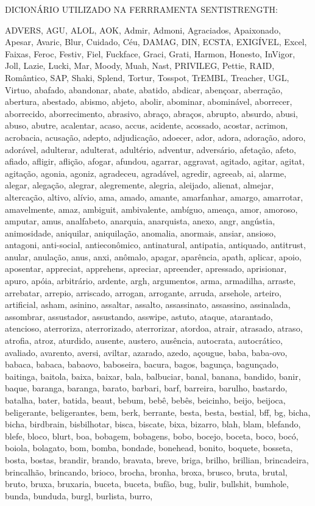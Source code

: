 \newpage
{}

DICIONÁRIO UTILIZADO NA FERRRAMENTA SENTISTRENGTH:



ADVERS, AGU, ALOL, AOK, Admir, Admoni, Agraciados, Apaixonado, Apesar, Avaric, Blur, Cuidado, Céu, DAMAG, DIN, ECSTA, EXIGÍVEL, Excel, Faixas, Feroc, Festiv, Fiel, Fuckface, Graci, Grati, Harmon, Honesto, InVigor, Joll, Lazie, Lucki, Mar, Moody, Muah, Nast, PRIVILEG, Pettie, RAID, Romântico, SAP, Shaki, Splend, Tortur, Tosspot, TrEMBL, Treacher, UGL, Virtuo, abafado, abandonar, abate, abatido, abdicar, abençoar, aberração, abertura, abestado, abismo, abjeto, abolir, abominar, abominável, aborrecer, aborrecido, aborrecimento, abrasivo, abraço, abraços, abrupto, absurdo, abusi, abuso, abutre, acalentar, acaso, accus, acidente, acossado, acostar, acrimon, acrobacia, acusação, adepto, adjudicação, adoecer, ador, adora, adoração, adoro, adorável, adulterar, adulterat, adultério, adventur, adversário, afetação, afeto, afiado, afligir, aflição, afogar, afundou, agarrar, aggravat, agitado, agitar, agitat, agitação, agonia, agoniz, agradeceu, agradável, agredir, agreeab, ai, alarme, alegar, alegação, alegrar, alegremente, alegria, aleijado, alienat, almejar, altercação, altivo, alívio, ama, amado, amante, amarfanhar, amargo, amarrotar, amavelmente, amaz, ambiguit, ambivalente, ambíguo, ameaça, amor, amoroso, amputar, amus, analfabeto, anarquia, anarquista, anexo, angr, angústia, animosidade, aniquilar, aniquilação, anomalia, anormais, ansiar, ansioso, antagoni, anti-social, antieconômico, antinatural, antipatia, antiquado, antitrust, anular, anulação, anus, anxi, anômalo, apagar, aparência, apath, aplicar, apoio, aposentar, appreciat, apprehens, apreciar, apreender, apressado, aprisionar, apuro, apóia, arbitrário, ardente, argh, argumentos, arma, armadilha, arraste, arrebatar, arrepio, arriscado, arrogan, arrogante, arruda, arsehole, arteiro, artificial, asham, asinino, assaltar, assalto, assassinato, assassino, assinalada, assombrar, assustador, assustando, asswipe, astuto, ataque, atarantado, atencioso, aterroriza, aterrorizado, aterrorizar, atordoa, atrair, atrasado, atraso, atrofia, atroz, aturdido, ausente, austero, ausência, autocrata, autocrático, avaliado, avarento, aversi, aviltar, azarado, azedo, açougue, baba, baba-ovo, babaca, babaca, babaovo, baboseira, bacura, bagos, bagunça, bagunçado, baitinga, baitola, baixa, baixar, bala, balbuciar, banal, banana, bandido, banir, baque, baranga, baranga, barato, barbari, barf, barreira, barulho, bastardo, batalha, bater, batida, beaut, bebum, bebê, bebês, beicinho, beijo, beijoca, beligerante, beligerantes, bem, berk, berrante, besta, besta, bestial, bff, bg, bicha, bicha, birdbrain, bisbilhotar, bisca, biscate, bixa, bizarro, blah, blam, blefando, blefe, bloco, blurt, boa, bobagem, bobagens, bobo, bocejo, boceta, boco, bocó, boiola, bolagato, bom, bomba, bondade, bonehead, bonito, boquete, bosseta, bosta, bostas, brandir, brando, bravata, breve, briga, brilho, brillian, brincadeira, brincalhão, brincando, brioco, brocha, bronha, broxa, brusco, bruta, brutal, bruto, bruxa, bruxaria, buceta, buceta, bufão, bug, bulir, bullshit, bumhole, bunda, bunduda, burgl, burlista, burro, 